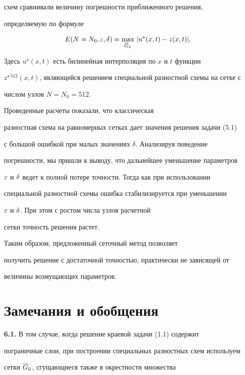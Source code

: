 схем сравнивали величину погрешности приближенного решения,


определяемую по формуле


$$


E(N=N_0,\eps,\delta)=\max_{\ovl{G}_h}\, |u^{\star}(x,t)-z(x,t)|.


$$


Здесь $u^{\star}(x,t)$ есть билинейная интерполяция по $x$ и $t$ функции


$z^{\star\,512}(x,t)$, являющейся решением специальной разностной схемы на сетке с


числом узлов $N=N_0=512$.





Проведенные расчеты показали, что классическая 


разностная схема на равномерных сетках дает значения решения задачи (5.1) 


с большой ошибкой при малых значениях $\delta$. Анализируя поведение 


погрешности, мы пришли к выводу, что дальнейшее уменьшение параметров 


$\varepsilon$ и $\delta$ ведет к полной потере точности. Тогда как при использовании


специальной разностной схемы ошибка стабилизируется при уменьшении 


$\varepsilon$ и $\delta$. При этом с ростом числа узлов расчетной


сетки точность решения растет.


Таким образом, предложенный сеточный метод позволяет 


получить решение с достаточной точностью, практически не зависящей от 


величины возмущающих параметров. 





\section{Замечания и обобщения}





{\bf 6.1.} В том случае, когда решение краевой задачи (1.1) содержит


пограничные слои, при построении специальных разностных схем используем 


сетки $\overline{G}_h$, сгущающиеся также в окрестности множества


